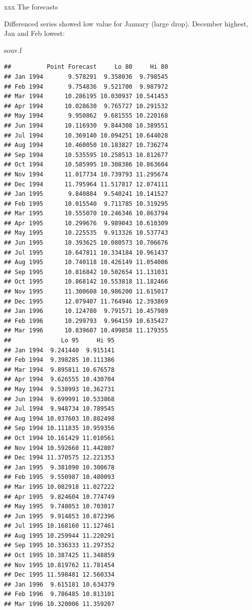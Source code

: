 \documentclass[ignorenonframetext,]{beamer}
\newenvironment{Shaded}{\begin{snugshade}}{\end{snugshade}}
\newcommand{\NormalTok}[1]{#1}
\begin{document}
\begin{frame}[fragile]{xxx The forecasts}
\protect\hypertarget{xxx-the-forecasts}{}

Differenced series showed low value for January (large drop). December
highest, Jan and Feb lowest:

\scriptsize

\begin{Shaded}
\begin{Highlighting}[]
\NormalTok{souv.f}
\end{Highlighting}
\end{Shaded}

\begin{verbatim}
##          Point Forecast     Lo 80     Hi 80
## Jan 1994       9.578291  9.358036  9.798545
## Feb 1994       9.754836  9.521700  9.987972
## Mar 1994      10.286195 10.030937 10.541453
## Apr 1994      10.028630  9.765727 10.291532
## May 1994       9.950862  9.681555 10.220168
## Jun 1994      10.116930  9.844308 10.389551
## Jul 1994      10.369140 10.094251 10.644028
## Aug 1994      10.460050 10.183827 10.736274
## Sep 1994      10.535595 10.258513 10.812677
## Oct 1994      10.585995 10.308386 10.863604
## Nov 1994      11.017734 10.739793 11.295674
## Dec 1994      11.795964 11.517817 12.074111
## Jan 1995       9.840884  9.540241 10.141527
## Feb 1995      10.015540  9.711785 10.319295
## Mar 1995      10.555070 10.246346 10.863794
## Apr 1995      10.299676  9.989043 10.610309
## May 1995      10.225535  9.913326 10.537743
## Jun 1995      10.393625 10.080573 10.706676
## Jul 1995      10.647811 10.334184 10.961437
## Aug 1995      10.740118 10.426149 11.054086
## Sep 1995      10.816842 10.502654 11.131031
## Oct 1995      10.868142 10.553818 11.182466
## Nov 1995      11.300608 10.986200 11.615017
## Dec 1995      12.079407 11.764946 12.393869
## Jan 1996      10.124780  9.791571 10.457989
## Feb 1996      10.299793  9.964159 10.635427
## Mar 1996      10.839607 10.499858 11.179355
##              Lo 95     Hi 95
## Jan 1994  9.241440  9.915141
## Feb 1994  9.398285 10.111386
## Mar 1994  9.895811 10.676578
## Apr 1994  9.626555 10.430704
## May 1994  9.538993 10.362731
## Jun 1994  9.699991 10.533868
## Jul 1994  9.948734 10.789545
## Aug 1994 10.037603 10.882498
## Sep 1994 10.111835 10.959356
## Oct 1994 10.161429 11.010561
## Nov 1994 10.592660 11.442807
## Dec 1994 11.370575 12.221353
## Jan 1995  9.381090 10.300678
## Feb 1995  9.550987 10.480093
## Mar 1995 10.082918 11.027222
## Apr 1995  9.824604 10.774749
## May 1995  9.748053 10.703017
## Jun 1995  9.914853 10.872396
## Jul 1995 10.168160 11.127461
## Aug 1995 10.259944 11.220291
## Sep 1995 10.336333 11.297352
## Oct 1995 10.387425 11.348859
## Nov 1995 10.819762 11.781454
## Dec 1995 11.598481 12.560334
## Jan 1996  9.615181 10.634379
## Feb 1996  9.786485 10.813101
## Mar 1996 10.320006 11.359207
\end{verbatim}


\end{frame}
\end{document}
